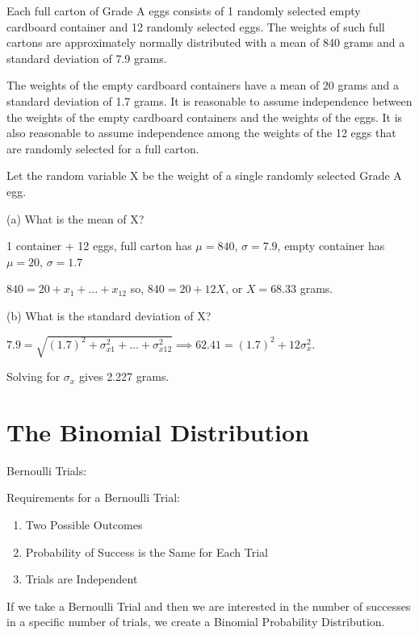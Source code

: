 \documentclass[../stats.tex]{subfiles}
\begin{document}
\begin{example}
    Each full carton of Grade A eggs consists of 1 randomly selected empty cardboard container and 12 randomly selected eggs. The weights of such full cartons are approximately normally distributed with a mean of 840 grams and a standard deviation of 7.9 grams.

    The weights of the empty cardboard containers have a mean of 20 grams and a standard deviation of 1.7 grams. It is reasonable to assume independence between the weights of the empty cardboard containers and the weights of the eggs. It is also reasonable to assume independence among the weights of the 12 eggs that are randomly selected for a full carton.

    Let the random variable X be the weight of a single randomly selected Grade A egg.

    (a) What is the mean of X?

    1 container + 12 eggs, full carton has $\mu=840$, $\sigma=7.9$, empty container has $\mu=20$, $\sigma=1.7$

    $840=20+x_1+\dots+x_{12}$ so, $840=20+12X$, or $X=68.33$ grams.

    (b) What is the standard deviation of X?

    $7.9=\sqrt{(1.7)^2+\sigma_{x1}^2+\dots+\sigma_{x12}^2} \implies 62.41 = (1.7)^2+12\sigma_x^2$.

    Solving for $\sigma_x$ gives 2.227 grams.
\end{example}
\pagebreak
\section{The Binomial Distribution}
Bernoulli Trials:

Requirements for a Bernoulli Trial:
\begin{enumerate}
    \item Two Possible Outcomes 
    \item Probability of Success is the Same for Each Trial 
    \item Trials are Independent
\end{enumerate}

If we take a Bernoulli Trial and then we are interested in the number of successes in a specific number of trials, we create a Binomial Probability Distribution.
\end{document}
